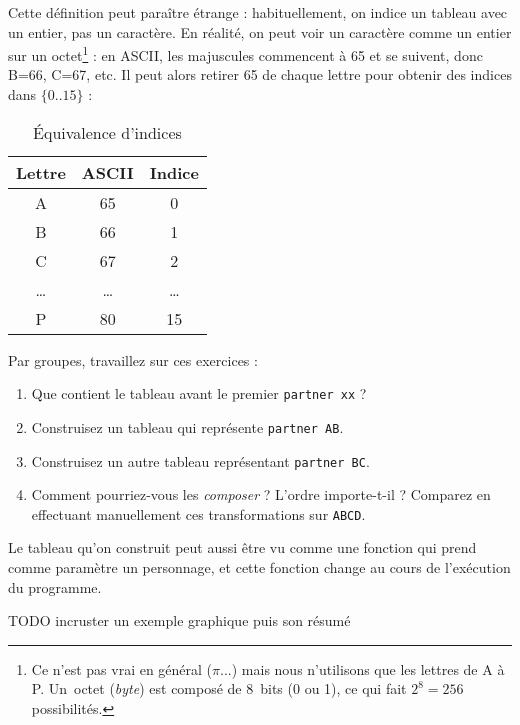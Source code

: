 \documentclass[11pt,a4paper,oneside]{article}
\begin{document}
Cette définition peut paraître étrange : habituellement, on indice un tableau
avec un entier, pas un caractère. En réalité, on peut voir un caractère
comme un entier sur un octet\footnote{Ce n'est pas vrai en général ($\pi$...)
mais nous n'utilisons que les lettres de A à P. Un~octet (\emph{byte}) est
composé de 8~bits (0 ou 1), ce qui fait $2^8=256$ possibilités.} : en ASCII,
les majuscules commencent à 65 et se suivent, donc B=66, C=67, etc. Il peut
alors retirer 65 de chaque lettre pour obtenir des indices dans $\{0..15\}$ :

\begin{table}[h]
\center
\begin{tabular}{c|c|c}
Lettre & ASCII & Indice \\ \hline\hline
A & 65 & 0 \\ \hline
B & 66 & 1 \\ \hline
C & 67 & 2 \\ \hline
\dots & \dots & \dots \\ \hline
P & 80 & 15
\end{tabular}
\caption{Équivalence d'indices}
\end{table}

Par groupes, travaillez sur ces exercices :
\begin{enumerate}
\item Que contient le tableau avant le premier \texttt{partner xx} ?
\item Construisez un tableau qui représente \texttt{partner AB}.
\item Construisez un autre tableau représentant \texttt{partner BC}.
\item Comment pourriez-vous les \emph{composer} ? L'ordre importe-t-il ?
	Comparez en effectuant manuellement ces transformations sur \texttt{ABCD}.
\end{enumerate}

Le tableau qu'on construit peut aussi être vu comme une fonction qui prend comme
paramètre un personnage, et cette fonction change au cours de l'exécution
du programme.

TODO incruster un exemple graphique puis son résumé
\end{document}
